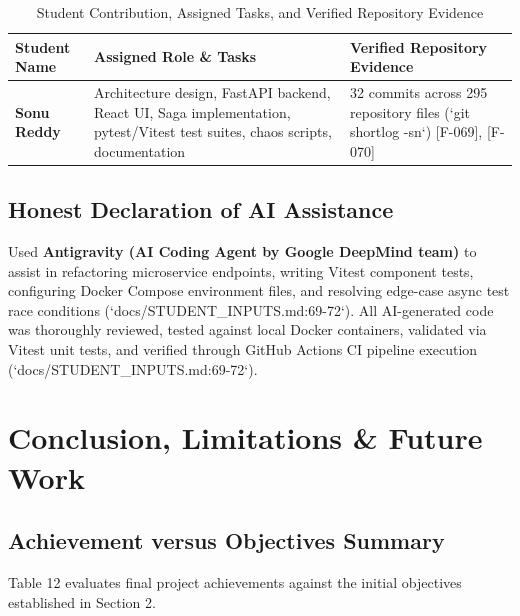 \documentclass[11pt,a4paper]{article}
\begin{document}
\begin{table}[htbp]
\caption{Student Contribution, Assigned Tasks, and Verified Repository Evidence}
\centering
\begin{tabularx}{\linewidth}{l X X}
\toprule
\textbf{Student Name} & \textbf{Assigned Role \& Tasks} & \textbf{Verified Repository Evidence} \\
\midrule
\textbf{Sonu Reddy} & Architecture design, FastAPI backend, React UI, Saga implementation, pytest/Vitest test suites, chaos scripts, documentation & 32 commits across 295 repository files (`git shortlog -sn`) [F-069], [F-070] \\
\bottomrule
\end{tabularx}
\end{table}

\subsection{Honest Declaration of AI Assistance}
Used \textbf{Antigravity (AI Coding Agent by Google DeepMind team)} to assist in refactoring microservice endpoints, writing Vitest component tests, configuring Docker Compose environment files, and resolving edge-case async test race conditions (`docs/STUDENT\_INPUTS.md:69-72`). All AI-generated code was thoroughly reviewed, tested against local Docker containers, validated via Vitest unit tests, and verified through GitHub Actions CI pipeline execution (`docs/STUDENT\_INPUTS.md:69-72`).

\section{Conclusion, Limitations \& Future Work}

\subsection{Achievement versus Objectives Summary}
Table 12 evaluates final project achievements against the initial objectives established in Section 2.
\end{document}
